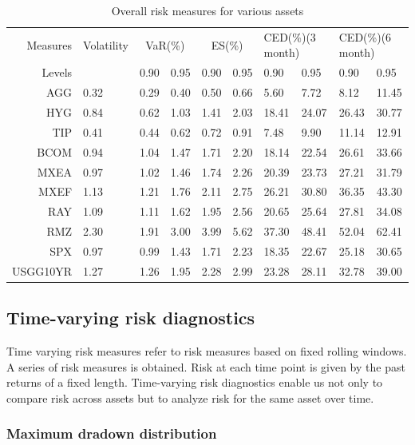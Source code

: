 \documentclass[11pt]{article}
\begin{document}
\begin{table}
\centering 
\begin{tabular}{ | r || p{1.5cm} | p{1cm} p{1cm} | p{1cm} p{1cm} | p{1cm} p{1cm} | p{1cm} p{1cm} | } 
 \hline
Measures & Volatility & \multicolumn{2}{c|}{VaR(\%)} & \multicolumn{2}{c|}{ES(\%)} &
 \multicolumn{2}{p{2cm}|}{CED(\%)\quad(3 month)} &\multicolumn{2}{p{2cm}|}{CED(\%)\quad(6 month)} \\ 
Levels & & 0.90 & 0.95 & 0.90 & 0.95 & 0.90 & 0.95 & 0.90 & 0.95 \\
  \hline \hline
AGG & 0.32 & 0.29 & 0.40 & 0.50 & 0.66 & 5.60 &  7.72 & 8.12 & 11.45  \\ 
HYG & 0.84 &  0.62 & 1.03 & 1.41 & 2.03 & 18.41 & 24.07 & 26.43 & 30.77 \\ 
TIP & 0.41 &  0.44 & 0.62 & 0.72 & 0.91 & 7.48 & 9.90 & 11.14 & 12.91 \\ 
BCOM & 0.94 &  1.04 & 1.47 & 1.71 & 2.20 & 18.14 & 22.54 & 26.61 & 33.66 \\ 
MXEA & 0.97 &  1.02 & 1.46 & 1.74 & 2.26 & 20.39 & 23.73 & 27.21 & 31.79 \\ 
MXEF & 1.13 &  1.21 & 1.76 & 2.11 & 2.75 & 26.21 & 30.80 & 36.35 & 43.30 \\ 
RAY & 1.09 &  1.11 & 1.62 & 1.95 & 2.56 & 20.65 & 25.64 & 27.81 & 34.08 \\ 
RMZ & 2.30 &  1.91 & 3.00 & 3.99 & 5.62 & 37.30 & 48.41 & 52.04 & 62.41 \\ 
SPX & 0.97 &  0.99 & 1.43 & 1.71 & 2.23 & 18.35 & 22.67 & 25.18 & 30.65 \\ 
USGG10YR & 1.27 & 1.26 & 1.95 & 2.28 & 2.99 & 23.28 & 28.11 & 32.78 & 39.00 \\
 \hline
\end{tabular}
\caption{Overall risk measures for various assets}
\label{table:Overall_risk}
\end{table}

\subsection{Time-varying risk diagnostics}

Time varying risk measures refer to risk measures based on fixed rolling windows. A series of risk measures is obtained. Risk at each time point is given by the past returns of a fixed length. Time-varying risk diagnostics enable us not only to compare risk across assets but to analyze risk for the same asset over time. 

\subsubsection{Maximum dradown distribution}
\end{document}

